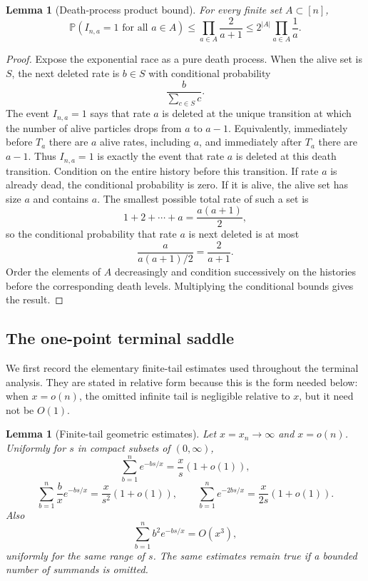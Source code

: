 \documentclass[11pt]{article}
\newtheorem{lemma}[theorem]{Lemma}
\theoremstyle{remark}
\newcommand{\Pp}{\mathbb P}
\begin{document}
\begin{lemma}[Death-process product bound]\label{lem:death-bound}
For every finite set \(A\subset[n]\),
\[
        \Pp(I_{n,a}=1\text{ for all }a\in A)
        \le \prod_{a\in A}\frac{2}{a+1}
        \le 2^{|A|}\prod_{a\in A}\frac1a .
\]
\end{lemma}

\begin{proof}
Expose the exponential race as a pure death process.  When the alive set is \(S\), the next deleted rate is \(b\in S\) with conditional probability
\[
        \frac{b}{\sum_{c\in S}c}.
\]
The event \(I_{n,a}=1\) says that rate \(a\) is deleted at the unique transition at which the number of alive particles drops from \(a\) to \(a-1\).  Equivalently, immediately before \(T_a\) there are \(a\) alive rates, including \(a\), and immediately after \(T_a\) there are \(a-1\).  Thus \(I_{n,a}=1\) is exactly the event that rate \(a\) is deleted at this death transition.  Condition on the entire history before this transition.  If rate \(a\) is already dead, the conditional probability is zero.  If it is alive, the alive set has size \(a\) and contains \(a\).  The smallest possible total rate of such a set is
\[
        1+2+\cdots+a=\frac{a(a+1)}2,
\]
so the conditional probability that rate \(a\) is next deleted is at most
\[
        \frac{a}{a(a+1)/2}=\frac{2}{a+1}.
\]
Order the elements of \(A\) decreasingly and condition successively on the histories before the corresponding death levels.  Multiplying the conditional bounds gives the result.
\end{proof}

\subsection{The one-point terminal saddle}

We first record the elementary finite-tail estimates used throughout the terminal analysis.  They are stated in relative form because this is the form needed below: when \(x=o(n)\), the omitted infinite tail is negligible relative to \(x\), but it need not be \(O(1)\).

\begin{lemma}[Finite-tail geometric estimates]\label{lem:terminal-geometric}
Let \(x=x_n\to\infty\) and \(x=o(n)\).  Uniformly for \(s\) in compact subsets of \((0,\infty)\),
\[
        \sum_{b=1}^n e^{-bs/x}=\frac{x}{s}(1+o(1)),
\]
\[
        \sum_{b=1}^n \frac{b}{x}e^{-bs/x}=\frac{x}{s^2}(1+o(1)),
        \qquad
        \sum_{b=1}^n e^{-2bs/x}=\frac{x}{2s}(1+o(1)).
\]
Also
\[
        \sum_{b=1}^n b^2 e^{-bs/x}=O(x^3),
\]
uniformly for the same range of \(s\).  The same estimates remain true if a bounded number of summands is omitted.
\end{lemma}
\end{document}
